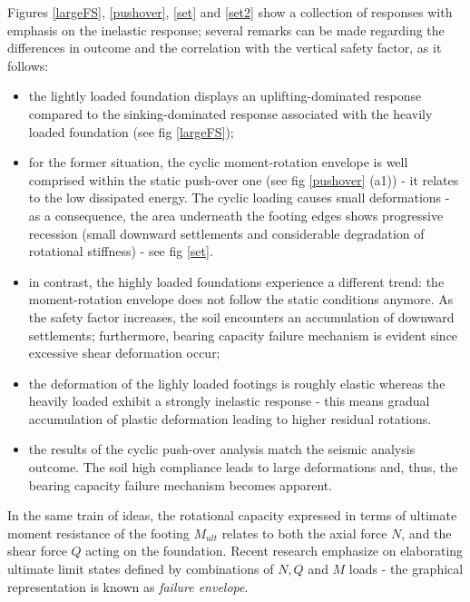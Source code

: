\documentclass[12pt,a4paper]{report}
\begin{document}
\newpage
Figures \ref{largeFS}, \ref{pushover}, \ref{set} and \ref{set2} show a collection of responses with emphasis on the inelastic response; several remarks can be made regarding the differences in outcome and the correlation with the vertical safety factor, as it follows:

\begin{itemize}
	\item the lightly loaded foundation displays an uplifting-dominated response compared to the sinking-dominated response associated with the heavily loaded foundation (see fig \ref{largeFS});
	\item for the former situation, the cyclic moment-rotation envelope is well comprised within the static push-over one (see fig \ref{pushover} (a1)) - it relates to the low dissipated energy. The cyclic loading causes small deformations - as a consequence, the area underneath the footing edges shows progressive recession (small downward settlements and considerable degradation of rotational stiffness) - see fig \ref{set}. 
	\item in contrast, the highly loaded foundations experience a different trend: the moment-rotation envelope does not follow the static conditions anymore. As the safety factor increases, the soil encounters an accumulation of downward settlements; furthermore, bearing capacity failure mechanism is evident since excessive shear deformation occur;
	\item the deformation of the lighly loaded footings is roughly elastic whereas the heavily loaded exhibit a strongly inelastic response - this means gradual accumulation of plastic deformation leading to higher residual rotations.
	\item the results of the cyclic push-over analysis match the seismic analysis outcome. The soil high compliance leads to large deformations and, thus, the bearing capacity failure mechanism becomes apparent.
\end{itemize}

In the same train of ideas, the rotational capacity expressed in terms of ultimate moment resistance of the footing $M_{ult}$ relates to both the axial force $N$, and the shear force $Q$ acting on the foundation. Recent research emphasize on elaborating ultimate limit states defined by combinations of $N, Q$ and $M$ loads - the \mbox{graphical} representation is known as \textit{failure envelope}.
	 
\end{document}
